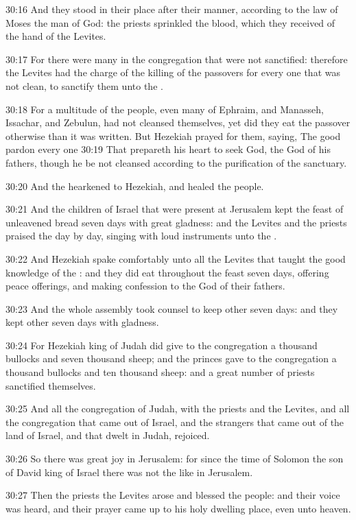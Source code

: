 30:16 And they stood in their place after their manner, according to
the law of Moses the man of God: the priests sprinkled the blood,
which they received of the hand of the Levites.

30:17 For there were many in the congregation that were not
sanctified: therefore the Levites had the charge of the killing of the
passovers for every one that was not clean, to sanctify them unto the
\LORD.

30:18 For a multitude of the people, even many of Ephraim, and
Manasseh, Issachar, and Zebulun, had not cleansed themselves, yet did
they eat the passover otherwise than it was written. But Hezekiah
prayed for them, saying, The good \LORD pardon every one 30:19 That
prepareth his heart to seek God, the \LORD God of his fathers, though
he be not cleansed according to the purification of the sanctuary.

30:20 And the \LORD hearkened to Hezekiah, and healed the people.

30:21 And the children of Israel that were present at Jerusalem kept
the feast of unleavened bread seven days with great gladness: and the
Levites and the priests praised the \LORD day by day, singing with loud
instruments unto the \LORD.

30:22 And Hezekiah spake comfortably unto all the Levites that taught
the good knowledge of the \LORD: and they did eat throughout the feast
seven days, offering peace offerings, and making confession to the
\LORD God of their fathers.

30:23 And the whole assembly took counsel to keep other seven days:
and they kept other seven days with gladness.

30:24 For Hezekiah king of Judah did give to the congregation a
thousand bullocks and seven thousand sheep; and the princes gave to
the congregation a thousand bullocks and ten thousand sheep: and a
great number of priests sanctified themselves.

30:25 And all the congregation of Judah, with the priests and the
Levites, and all the congregation that came out of Israel, and the
strangers that came out of the land of Israel, and that dwelt in
Judah, rejoiced.

30:26 So there was great joy in Jerusalem: for since the time of
Solomon the son of David king of Israel there was not the like in
Jerusalem.

30:27 Then the priests the Levites arose and blessed the people: and
their voice was heard, and their prayer came up to his holy dwelling
place, even unto heaven.

